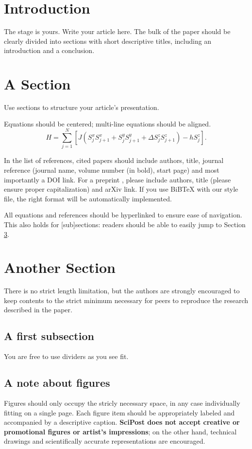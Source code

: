 \documentclass[submission, Phys]{SciPost}
\begin{document}
\section{Introduction}
\label{sec:intro}
The stage is yours. Write your article here.
The bulk of the paper should be clearly divided into sections with short descriptive titles, including an introduction and a conclusion.



\section{A Section}
Use sections to structure your article's presentation.

Equations should be centered; multi-line equations should be aligned.
\begin{equation}
H = \sum_{j=1}^N \left[J (S^x_j S^x_{j+1} + S^y_j S^y_{j+1} + \Delta S^z_j S^z_{j+1}) - h S^z_j \right].
\end{equation}

In the list of references, cited papers \cite{1931_Bethe_ZP_71} should include authors, title, journal reference (journal name, volume number (in bold), start page) and most importantly a DOI link. For a preprint \cite{arXiv:1108.2700}, please include authors, title (please ensure proper capitalization) and arXiv link. If you use BiBTeX with our style file, the right format will be automatically implemented.

All equations and references should be hyperlinked to ensure ease of navigation. This also holds for [sub]sections: readers should be able to easily jump to Section \ref{sec:another}.

\section{Another Section}
\label{sec:another}
There is no strict length limitation, but the authors are strongly encouraged to keep contents to the strict minimum necessary for peers to reproduce the research described in the paper.

\subsection{A first subsection}
You are free to use dividers as you see fit.
\subsection{A note about figures}
Figures should only occupy the stricly necessary space, in any case individually fitting on a single page. Each figure item should be appropriately labeled and accompanied by a descriptive caption. {\bf SciPost does not accept creative or promotional figures or artist's impressions}; on the other hand, technical drawings and scientifically accurate representations are encouraged.
\end{document}
